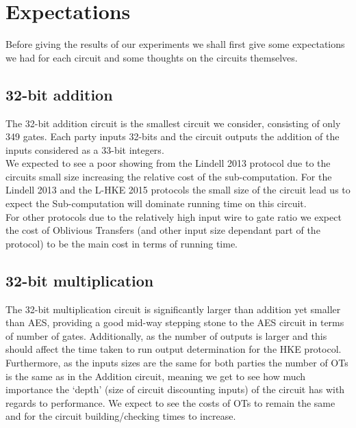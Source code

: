 \documentclass[ %
                    author={Nicholas Tutte},
                supervisor={Prof. Nigel Smart},
                    degree={MEng},
                     title={Secure Two Party Computation},
                  subtitle={A practical comparison of recent protocols},
                      type={Research - GG1K},
                      year={2015} ]{dissertation}
\begin{document}
		\section{Expectations}
			Before giving the results of our experiments we shall first give some expectations we had for each circuit and some thoughts on the circuits themselves.

			\subsection{32-bit addition}
				The 32-bit addition circuit is the smallest circuit we consider, consisting of only 349 gates. Each party inputs 32-bits and the circuit outputs the addition of the inputs considered as a 33-bit integers.\\

				We expected to see a poor showing from the Lindell 2013 protocol due to the circuits small size increasing the relative cost of the sub-computation. For the Lindell 2013 and the L-HKE 2015 protocols the small size of the circuit lead us to expect the Sub-computation will dominate running time on this circuit.\\

				For other protocols due to the relatively high input wire to gate ratio we expect the cost of Oblivious Transfers (and other input size dependant part of the protocol) to be the main cost in terms of running time.

			\subsection{32-bit multiplication}

				The 32-bit multiplication circuit is significantly larger than addition yet smaller than AES, providing a good mid-way stepping stone to the AES circuit in terms of number of gates. Additionally, as the number of outputs is larger and this should affect the time taken to run output determination for the HKE protocol.\\

				Furthermore, as the inputs sizes are the same for both parties the number of OTs is the same as in the Addition circuit, meaning we get to see how much importance the `depth' (size of circuit discounting inputs) of the circuit has with regards to performance. We expect to see the costs of OTs to remain the same and for the circuit building/checking times to increase.\\
				
\end{document}

